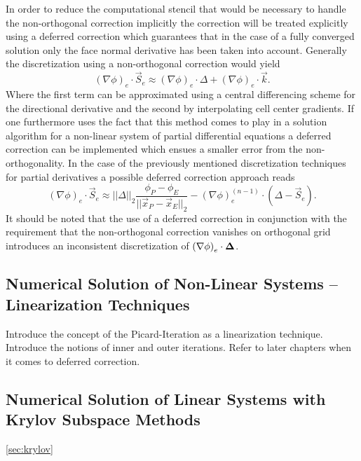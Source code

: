       In order to reduce the computational stencil that would be necessary to handle the non-orthogonal correction implicitly the correction will be treated explicitly using a deferred correction which guarantees that in the case of a fully converged solution only the face normal derivative has been taken into account. Generally the discretization using a non-orthogonal correction would yield 
      \begin{displaymath}
        \left( \nabla \phi \right)_e \cdot \vec{S}_e \approx \left(\nabla \phi \right)_e \cdot \Delta + \left( \nabla \phi \right)_e \cdot \vec{k}.
      \end{displaymath}
      Where the first term can be approximated using a central differencing scheme for the directional derivative and the second by interpolating cell center gradients. If one furthermore uses the fact that this method comes to play in a solution algorithm for a non-linear system of partial differential equations a deferred correction can be implemented which ensues a smaller error from the non-orthogonality. In the case of the previously mentioned discretization techniques for partial derivatives a possible deferred correction approach reads
      \begin{displaymath}
        \left( \nabla \phi \right)_e \cdot \vec{S}_e \approx ||\Delta||_2 \frac{\phi_P - \phi_E}{||\vec{x}_P - \vec{x}_E||_2} - \left(\nabla \phi \right)_e^{(n-1)} \cdot \left(\Delta - \vec{S}_e \right).
      \end{displaymath}
      It should be noted that the use of a deferred correction in conjunction with the requirement that the non-orthogonal correction vanishes on orthogonal grid introduces an inconsistent discretization of \( \left(\nabla \phi \right)_e \cdot \boldsymbol{\Delta} \).

    \subsection{Numerical Solution of Non-Linear Systems -- Linearization Techniques}
    \label{sec:nonlinear}

      Introduce the concept of the Picard-Iteration as a linearization technique. Introduce the notions of inner and outer iterations. Refer to later chapters when it comes to deferred correction.

      \subsection{Numerical Solution of Linear Systems with Krylov Subspace Methods}
      \ref{sec:krylov}

